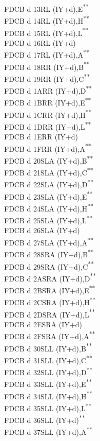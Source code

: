 \documentclass[twoside,openright,a4paper]{book}
\newcommand{\UNDOC}{\textnormal{\textsuperscript{**}}}
\begin{document}
\begin{multicols}{3}
{\begin{tabbing}
	FDCB d 13\>RL (IY+d),E\UNDOC\\
	FDCB d 14\>RL (IY+d),H\UNDOC\\
	FDCB d 15\>RL (IY+d),L\UNDOC\\
	FDCB d 16\>RL (IY+d)\\
	FDCB d 17\>RL (IY+d),A\UNDOC\\
	FDCB d 18\>RR (IY+d),B\UNDOC\\
	FDCB d 19\>RR (IY+d),C\UNDOC\\
	FDCB d 1A\>RR (IY+d),D\UNDOC\\
	FDCB d 1B\>RR (IY+d),E\UNDOC\\
	FDCB d 1C\>RR (IY+d),H\UNDOC\\
	FDCB d 1D\>RR (IY+d),L\UNDOC\\
	FDCB d 1E\>RR (IY+d)\\
	FDCB d 1F\>RR (IY+d),A\UNDOC\\
	FDCB d 20\>SLA (IY+d),B\UNDOC\\
	FDCB d 21\>SLA (IY+d),C\UNDOC\\
	FDCB d 22\>SLA (IY+d),D\UNDOC\\
	FDCB d 23\>SLA (IY+d),E\UNDOC\\
	FDCB d 24\>SLA (IY+d),H\UNDOC\\
	FDCB d 25\>SLA (IY+d),L\UNDOC\\
	FDCB d 26\>SLA (IY+d)\\
	FDCB d 27\>SLA (IY+d),A\UNDOC\\
	FDCB d 28\>SRA (IY+d),B\UNDOC\\
	FDCB d 29\>SRA (IY+d),C\UNDOC\\
	FDCB d 2A\>SRA (IY+d),D\UNDOC\\
	FDCB d 2B\>SRA (IY+d),E\UNDOC\\
	FDCB d 2C\>SRA (IY+d),H\UNDOC\\
	FDCB d 2D\>SRA (IY+d),L\UNDOC\\
	FDCB d 2E\>SRA (IY+d)\\
	FDCB d 2F\>SRA (IY+d),A\UNDOC\\
	FDCB d 30\>SLL (IY+d),B\UNDOC\\
	FDCB d 31\>SLL (IY+d),C\UNDOC\\
	FDCB d 32\>SLL (IY+d),D\UNDOC\\
	FDCB d 33\>SLL (IY+d),E\UNDOC\\
	FDCB d 34\>SLL (IY+d),H\UNDOC\\
	FDCB d 35\>SLL (IY+d),L\UNDOC\\
	FDCB d 36\>SLL (IY+d)\UNDOC\\
	FDCB d 37\>SLL (IY+d),A\UNDOC\\

\end{tabbing}}
\end{multicols}
\end{document}
